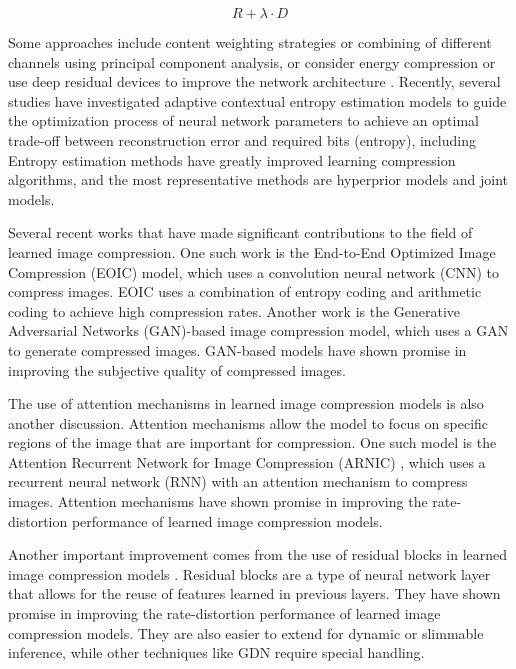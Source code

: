 \documentclass{article}
\begin{document}
\begin{equation}
    R + \lambda \cdot D
\end{equation}

Some approaches include content weighting strategies or combining of different channels using principal component analysis, or consider energy compression or use deep residual devices to improve the network architecture \cite{balle2016}. Recently, several studies have investigated adaptive contextual entropy estimation models to guide the optimization process of neural network parameters to achieve an optimal trade-off between reconstruction error and required bits (entropy), including \cite{AgustssonEirikur2017SVQf, balle2018, mbt2018, LeeJooyoung2019CEMf} Entropy estimation methods have greatly improved learning compression algorithms, and the most representative methods are hyperprior models and joint models.


Several recent works that have made significant contributions to the field of learned image compression. One such work is the \cite{VincentPascal2008Eacr, TheisLucas2017Licw, balle2016} End-to-End Optimized Image Compression (EOIC) model, which uses a convolution neural network (CNN) to compress images. EOIC uses a combination of entropy coding and arithmetic coding to achieve high compression rates. Another work is the Generative Adversarial Networks (GAN)-based image compression model, which uses a GAN to generate compressed images. GAN-based models have shown promise in improving the subjective quality of compressed images.

The use of attention mechanisms in learned image compression models is also another discussion. Attention mechanisms allow the model to focus on specific regions of the image that are important for compression. One such model is the Attention Recurrent Network for Image Compression (ARNIC) \cite{XueYuyang2019ABIC}, which uses a recurrent neural network (RNN) with an attention mechanism to compress images. Attention mechanisms have shown promise in improving the rate-distortion performance of learned image compression models.

Another important improvement comes from the use of residual blocks in learned image compression models \cite{balle2016}. Residual blocks are a type of neural network layer that allows for the reuse of features learned in previous layers. They have shown promise in improving the rate-distortion performance of learned image compression models. They are also easier to extend for dynamic or slimmable inference, while other techniques like GDN require special handling.
\end{document}
